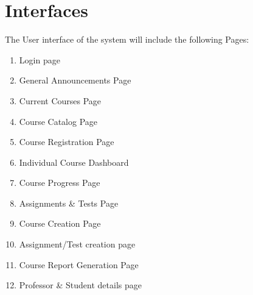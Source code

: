 \documentclass[12pt, a4]{report}
\begin{document}

\section{Interfaces}
The User interface of the system will include the following Pages:
\begin{enumerate}
    \item Login page
    \item General Announcements Page
    \item Current Courses Page
    \item Course Catalog Page
    \item Course Registration Page
    \item Individual Course Dashboard
    \item Course Progress Page
    \item Assignments \& Tests Page
    \item Course Creation Page
    \item Assignment/Test creation page
    \item Course Report Generation Page
    \item Professor \& Student details page
\end{enumerate}
\end{document}
